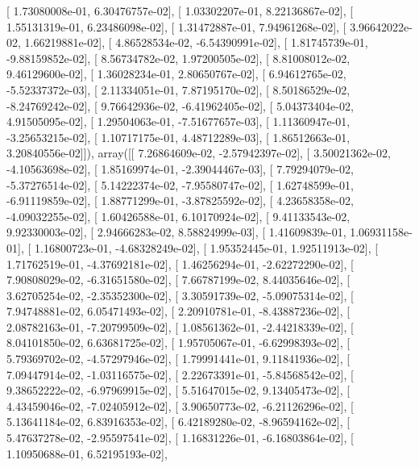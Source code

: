 \documentclass{article}
\begin{document}
       [  1.73080008e-01,   6.30476757e-02],
       [  1.03302207e-01,   8.22136867e-02],
       [  1.55131319e-01,   6.23486098e-02],
       [  1.31472887e-01,   7.94961268e-02],
       [  3.96642022e-02,   1.66219881e-02],
       [  4.86528534e-02,  -6.54390991e-02],
       [  1.81745739e-01,  -9.88159852e-02],
       [  8.56734782e-02,   1.97200505e-02],
       [  8.81008012e-02,   9.46129600e-02],
       [  1.36028234e-01,   2.80650767e-02],
       [  6.94612765e-02,  -5.52337372e-03],
       [  2.11334051e-01,   7.87195170e-02],
       [  8.50186529e-02,  -8.24769242e-02],
       [  9.76642936e-02,  -6.41962405e-02],
       [  5.04373404e-02,   4.91505095e-02],
       [  1.29504063e-01,  -7.51677657e-03],
       [  1.11360947e-01,  -3.25653215e-02],
       [  1.10717175e-01,   4.48712289e-03],
       [  1.86512663e-01,   3.20840556e-02]]), array([[  7.26864609e-02,  -2.57942397e-02],
       [  3.50021362e-02,  -4.10563698e-02],
       [  1.85169974e-01,  -2.39044467e-03],
       [  7.79294079e-02,  -5.37276514e-02],
       [  5.14222374e-02,  -7.95580747e-02],
       [  1.62748599e-01,  -6.91119859e-02],
       [  1.88771299e-01,  -3.87825592e-02],
       [  4.23658358e-02,  -4.09032255e-02],
       [  1.60426588e-01,   6.10170924e-02],
       [  9.41133543e-02,   9.92330003e-02],
       [  2.94666283e-02,   8.58824999e-03],
       [  1.41609839e-01,   1.06931158e-01],
       [  1.16800723e-01,  -4.68328249e-02],
       [  1.95352445e-01,   1.92511913e-02],
       [  1.71762519e-01,  -4.37692181e-02],
       [  1.46256294e-01,  -2.62272290e-02],
       [  7.90808029e-02,  -6.31651580e-02],
       [  7.66787199e-02,   8.44035646e-02],
       [  3.62705254e-02,  -2.35352300e-02],
       [  3.30591739e-02,  -5.09075314e-02],
       [  7.94748881e-02,   6.05471493e-02],
       [  2.20910781e-01,  -8.43887236e-02],
       [  2.08782163e-01,  -7.20799509e-02],
       [  1.08561362e-01,  -2.44218339e-02],
       [  8.04101850e-02,   6.63681725e-02],
       [  1.95705067e-01,  -6.62998393e-02],
       [  5.79369702e-02,  -4.57297946e-02],
       [  1.79991441e-01,   9.11841936e-02],
       [  7.09447914e-02,  -1.03116575e-02],
       [  2.22673391e-01,  -5.84568542e-02],
       [  9.38652222e-02,  -6.97969915e-02],
       [  5.51647015e-02,   9.13405473e-02],
       [  4.43459046e-02,  -7.02405912e-02],
       [  3.90650773e-02,  -6.21126296e-02],
       [  5.13641184e-02,   6.83916353e-02],
       [  6.42189280e-02,  -8.96594162e-02],
       [  5.47637278e-02,  -2.95597541e-02],
       [  1.16831226e-01,  -6.16803864e-02],
       [  1.10950688e-01,   6.52195193e-02],
\end{document}
